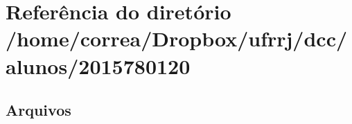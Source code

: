 \section{Referência do diretório /home/correa/\+Dropbox/ufrrj/dcc/alunos/2015780120}
\label{dir_369839ea276ae9218ec1c3e4f42a7343}
\subsection*{Arquivos}
\begin{DoxyCompactItemize}
\end{DoxyCompactItemize}
